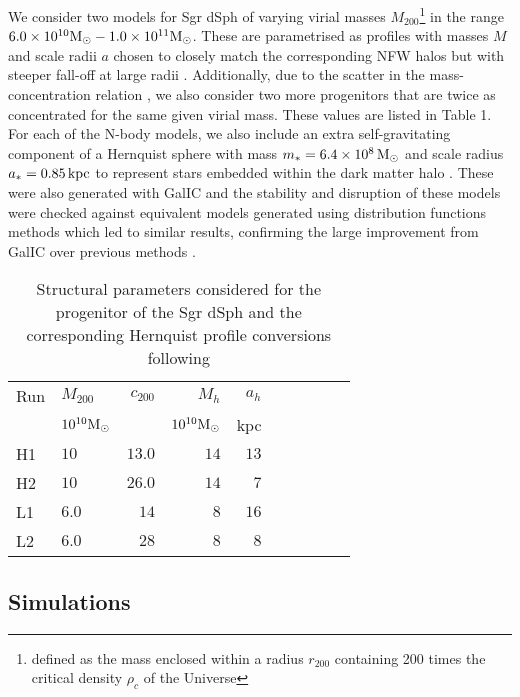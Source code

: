 \documentclass[useAMS,usenatbib]{mnras}
\begin{document}
We consider two models for Sgr dSph of varying virial masses $M_{200}$\footnote{defined as the mass enclosed within a radius $r_{200}$ containing 200 times the critical density $\rho_{c}$ of the Universe} in the range $6.0\times 10^{10} \rm{M_{\odot}} - 1.0 \times 10^{11} {\rm{M_\odot}}$. These are parametrised as \cite{Hernquist1990} profiles with masses $M$ and scale radii $a$ chosen to closely match the corresponding NFW \citep{Navarro1996} halos but with steeper fall-off at large radii \citep{Jang2001}. Additionally, due to the scatter in the mass-concentration relation \citep{gao08,ludlow14}, we also consider two more progenitors that are twice as concentrated for the same given virial mass. These values are listed in Table 1. For each of the N-body models, we also include an extra self-gravitating component of a Hernquist sphere with mass $m_{*}=6.4\times10^{8}\,\rm{M_{\odot}}$ and scale radius $a_{*}=0.85\,\rm{kpc}$ to represent stars embedded within the dark matter halo \citep{ostholt12}. These were also generated with GalIC and the stability and disruption of these models were checked against equivalent models generated using distribution functions methods \citep{Kazantzidis2004, Laporte15} which led to similar results, confirming the large improvement from GalIC over previous methods \citep{Springel2005c}.

\begin{table}
 \centering
 \begin{minipage}{130mm}
  \begin{tabular}{@{}llrrrrlrlr@{}}
  \hline
Run & $ M_{200}$ & $c_{200}$ & $M_{h}$ & $a_{h}$ \\
 &   $10^{10}\rm{M_{\odot}}$ &  & $10^{10}\rm{M_{\odot}}$ & \rm{kpc} \\
  \hline
H1 & $10$  & $13.0$ &$14$& $ 13$ \\
H2 & $10$  & $26.0$ & $14$ & $ 7  $ \\
L1 & $6.0$ & $14$ & $8$&$ 16 $ \\
L2 & $6.0$ & $28 $ & $8$ &$ 8 $ \\
\hline
\end{tabular}
\end{minipage}
\caption[LMC ICs]{Structural parameters considered for the progenitor of the Sgr dSph and the corresponding Hernquist profile conversions following \cite{vdmarel12}}
\end{table}


\subsection{Simulations}
\end{document}

